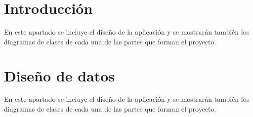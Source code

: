 \section{Introducción}\label{introduccion-diseño}
En este apartado se incluye el diseño de la aplicación y se mostrarán también los diagramas de clases de cada una de las partes que forman el proyecto.

\section{Diseño de datos}\label{ddatos}

En este apartado se incluye el diseño de la aplicación y se mostrarán también los diagramas de clases de cada una de las partes que forman el proyecto.





